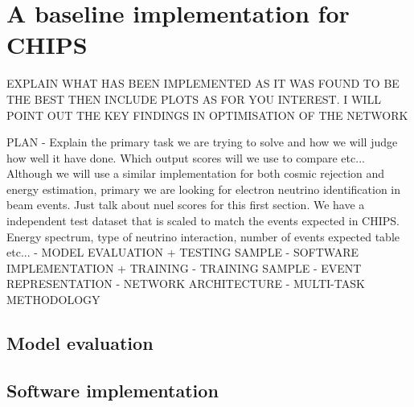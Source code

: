 \section{A baseline implementation for CHIPS} %
\label{sec:cvn_baseline} %

EXPLAIN WHAT HAS BEEN IMPLEMENTED AS IT WAS FOUND TO BE THE BEST THEN INCLUDE PLOTS AS FOR YOU
INTEREST.
I WILL POINT OUT THE KEY FINDINGS IN OPTIMISATION OF THE NETWORK

PLAN
- Explain the primary task we are trying to solve and how we will judge how well it have done.
Which output scores will we use to compare etc... Although we will use a similar implementation
for both cosmic rejection and energy estimation, primary we are looking for electron neutrino
identification in beam events. Just talk about nuel scores for this first section. We have a
independent test dataset that is scaled to match the events expected in CHIPS. Energy spectrum,
type of neutrino interaction, number of events expected table etc...
- MODEL EVALUATION + TESTING SAMPLE
- SOFTWARE IMPLEMENTATION + TRAINING
- TRAINING SAMPLE
- EVENT REPRESENTATION
- NETWORK ARCHITECTURE
- MULTI-TASK METHODOLOGY

\subsection{Model evaluation} %
\label{sec:cvn_baseline_soft} %

\subsection{Software implementation} %
\label{sec:cvn_baseline_soft} %

